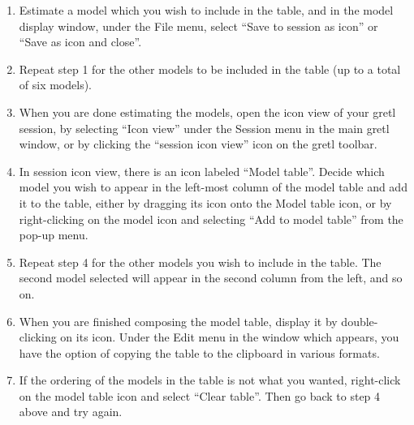 \begin{enumerate}
\item Estimate a model which you wish to include in
	    the table, and in the model display window, under the File
	    menu, select ``Save to session as icon'' or
	    ``Save as icon and close''.
\item Repeat step 1 for the other models to be
	    included in the table (up to a total of six
	    models).
\item When you are done estimating the models, open
	    the icon view of your gretl session, by selecting
	    ``Icon view'' under the Session menu in the
	    main gretl window, or by clicking the ``session icon
	      view'' icon on the gretl toolbar.
\item In session icon view, there is an icon labeled
	    ``Model table''. Decide which model you wish to
	    appear in the left-most column of the model table and add
	    it to the table, either by dragging its icon onto the
	    Model table icon, or by right-clicking on the model icon
	    and selecting ``Add to model table'' from the
	    pop-up menu.
\item Repeat step 4 for the other models you wish to
	    include in the table.  The second model selected will
	    appear in the second column from the left, and so
	    on.
\item When you are finished composing the model
	    table, display it by double-clicking on its icon.  Under
	    the Edit menu in the window which appears, you have the
	    option of copying the table to the clipboard in various
	    formats.
\item If the ordering of the models in the table is
	    not what you wanted, right-click on the model table icon
	    and select ``Clear table''.  Then go back to
	    step 4 above and try again.
\end{enumerate}

